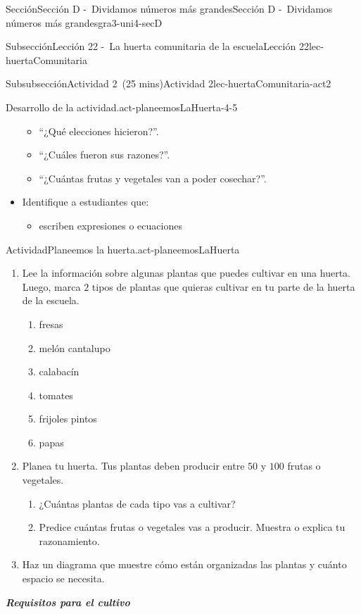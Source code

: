 \documentclass[oneside,10pt,]{article}
\newcommand{\alert}[1]{\textbf{\textit{#1}}}
\begin{document}
\begin{sectionptx}{Sección}{Sección D -~Dividamos números más grandes}{}{Sección D -~Dividamos números más grandes}{}{}{gra3-uni4-secD}
\begin{subsectionptx}{Subsección}{Lección 22 -~La huerta comunitaria de la escuela}{}{Lección 22}{}{}{lec-huertaComunitaria}
\begin{subsubsectionptx}{Subsubsección}{Actividad 2~(25 mins)}{}{Actividad 2}{}{}{lec-huertaComunitaria-act2}
\begin{paragraphs}{Desarrollo de la actividad.}{act-planeemosLaHuerta-4-5}
\begin{itemize}[label=\textbullet]
%
\begin{itemize}[label=$\circ$]
\item{}``¿Qué elecciones hicieron?''.%
\item{}``¿Cuáles fueron sus razones?''.%
\item{}``¿Cuántas frutas y vegetales van a poder cosechar?''.%
\end{itemize}
\item{}Identifique a estudiantes que:%
%
\begin{itemize}[label=$\circ$]
\item{}escriben expresiones o ecuaciones%
\end{itemize}
\end{itemize}
\end{paragraphs}%
\begin{activity}{Actividad}{Planeemos la huerta.}{act-planeemosLaHuerta}%
%
\begin{enumerate}
\item{}Lee la información sobre algunas plantas que puedes cultivar en una huerta. Luego, marca \(2\) tipos de plantas que quieras cultivar en tu parte de la huerta de la escuela.%
%
\begin{enumerate}
\item{}fresas%
\item{}melón cantalupo%
\item{}calabacín%
\item{}tomates%
\item{}frijoles pintos%
\item{}papas%
\end{enumerate}
\item{}Planea tu huerta. Tus plantas deben producir entre \(50\) y \(100\) frutas o vegetales.%
%
\begin{enumerate}
\item{}¿Cuántas plantas de cada tipo vas a cultivar?%
\item{}Predice cuántas frutas o vegetales vas a producir. Muestra o explica tu razonamiento.%
\end{enumerate}
\item{}Haz un diagrama que muestre cómo están organizadas las plantas y cuánto espacio se necesita.%
\end{enumerate}
\alert{Requisitos para el cultivo}%
\begin{sidebyside}{2}{0.025}{0.025}{0.05}%
\begin{sbspanel}{0.45}%

\end{sbspanel}
\end{sidebyside}
\end{activity}
\end{subsubsectionptx}
\end{subsectionptx}
\end{sectionptx}
\end{document}
